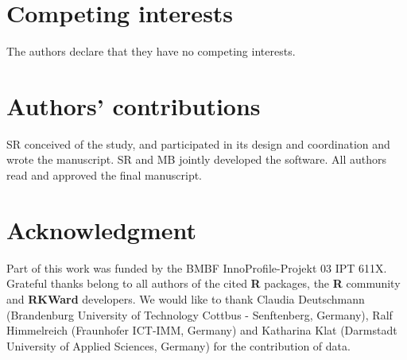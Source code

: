\documentclass[twocolumn]{bmcart}%
\begin{document}

\begin{backmatter}

\section*{Competing interests}
The authors declare that they have no competing interests.

\section*{Authors' contributions}
SR conceived of the study, and participated in its design and coordination and 
wrote the manuscript. SR and MB jointly developed the software. All authors read 
and approved the final manuscript.

\section*{Acknowledgment}
Part of this work was funded by the BMBF InnoProfile-Projekt 03 IPT 611X. 
Grateful thanks belong to all authors of the cited \textbf{R} packages, the 
\textbf{R} community and \textbf{RKWard} developers. We would like to thank 
Claudia Deutschmann (Brandenburg University of Technology Cottbus - Senftenberg, 
Germany), Ralf Himmelreich (Fraunhofer ICT-IMM, Germany) and Katharina Klat 
(Darmstadt University of Applied Sciences, Germany) for the contribution of 
data.


\end{backmatter}
\end{document}
